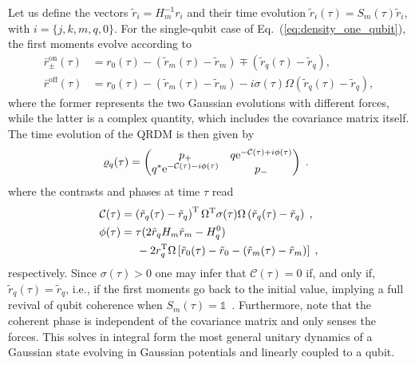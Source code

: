 \documentclass[%
reprint,
superscriptaddress,
nofootinbib,
 amsmath,amssymb,
prx,
floatfix,
]{revtex4-2}
\begin{document}
Let us define the vectors $\tilde{r}_i =  H_m ^{-1} r_i$ and their time evolution $ \tilde{r}_i (\tau) =S_m(\tau)  \tilde{r}_i$,  with $i = \{j,k,m, q, 0\}$. For the single-qubit case of Eq.~(\ref{eq:density_one_qubit}), the first moments evolve according to
\begin{align}
\label{eq:r_on_force_sol}
     \bar{r}^{\text{on}}_{\pm}(\tau) &=   r_0 (\tau) -  (\tilde{r}_m(\tau) - \tilde{r}_m) \mp (\tilde{r}_q(\tau) - \tilde{r}_q), \\ 
     \bar{r}^{\text{off}} (\tau) &= r_0(\tau) -  \left( \tilde{r}_m(\tau) - \tilde{r}_m \right) - i \sigma (\tau)   \Omega  \left( \tilde{r}_q (\tau) - \tilde{r}_q \right)  , \nonumber
\end{align}
where the former represents the two Gaussian evolutions with different forces, while the latter is a complex quantity, which includes the covariance matrix itself. The time evolution of the QRDM is then given by 
\begin{equation}
\label{eq:QRDM_1}
    \hspace{-0.2cm}\varrho_q (\tau) = \begin{pmatrix}
        p_+ & q {\rm e}^{ - \mathcal{C} (\tau) + i  \phi (\tau) } \\
       q^* {\rm e}^{ - \mathcal{C} (\tau) - i  \phi(\tau)}   & p_- \\ 
    \end{pmatrix} \;.
\end{equation}
where the contrasts and phases at time $\tau$ read
\begin{align} 
\label{eq:phi_c_force_sol}
     \mathcal{C} (\tau) &=   \left(\tilde{r}_q (\tau) - \tilde{r}_q \right)^{\rm T} \Omega^{\rm T}  \sigma (\tau)   \Omega  \left(\tilde{r}_q (\tau) - \tilde{r}_q \right) \nonumber \;,\\
      \phi (\tau) &=  \tau (2 \tilde{r}_q H_m \tilde{r}_m - H_q^0) \\
      & \hspace{0.5cm}- 2 r_q^{\rm T} \Omega \left[ \tilde{r}_0 (\tau) - \tilde{r}_0 - ( \tilde{r}_m (\tau) - \tilde{r}_m ) \right]   \nonumber \;,
\end{align}
respectively. Since $\sigma(\tau)>0$ one may infer that $ \mathcal{C} (\tau) =0$ if, and only if, $\tilde{r}_q (\tau) = \tilde{r}_q$, i.e., if the first moments go back to the initial value, implying a full revival of qubit coherence when $S_m(\tau) = \mathds{1}$~\cite{braccini_exponential_2024}. Furthermore, note that the coherent phase is independent of the covariance matrix and only senses the forces. 
This solves in integral form the most general unitary dynamics of a Gaussian state evolving in Gaussian potentials and linearly coupled to a qubit.
\end{document}
